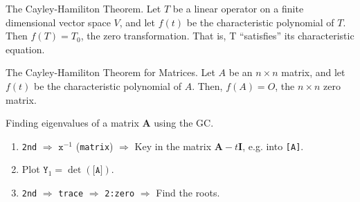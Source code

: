 \documentclass[../Notes.tex]{subfiles}
\begin{document}
\begin{theorem}{The Cayley-Hamiliton Theorem.}{}
    Let \(T\) be a linear operator on a finite dimensional vector space \(V\), and let \(f(t)\) be the characteristic polynomial of \(T\). Then \(f(T)=T_0\), the zero transformation. That is, T ``satisfies'' its characteristic equation.
\end{theorem}
\begin{corollary}{The Cayley-Hamiliton Theorem for Matrices.}{}
    Let \(A\) be an \(n\times n\) matrix, and let \(f(t)\) be the characteristic polynomial of \(A\). Then, \(f(A)=O\), the \(n\times n\) zero matrix.  
\end{corollary}
\hypertarget{characteristic-polynomial-roots}{}
\begin{GCSkills}{}
    Finding eigenvalues of a matrix \(\mathbf{A}\) using the GC.
    \begin{enumerate}
        \item \texttt{2nd} \(\Longrightarrow\) \(\texttt{x}^{-1}\) (\texttt{matrix}) \(\Longrightarrow\) Key in the matrix \(\mathbf{A}-t\mathbf{I}\), e.g. into \texttt{[A]}. 
        \item Plot \(\texttt{Y}_1=\det{(\texttt{[A]})}\).
        \item \texttt{2nd} \(\Longrightarrow\) \texttt{trace} \(\Longrightarrow\) \texttt{2:zero} \(\Longrightarrow\) Find the roots.
    \end{enumerate}
\end{GCSkills}
\newpage
\end{document}

